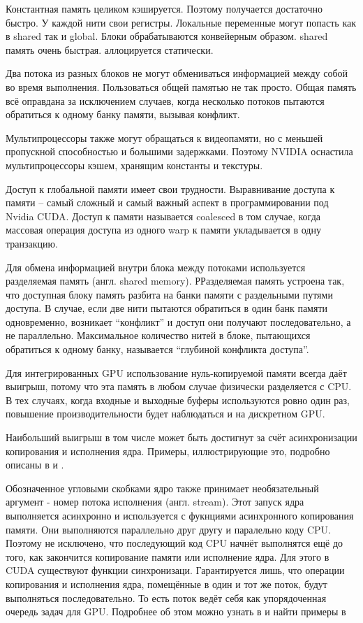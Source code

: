 \documentclass[a4paper,14pt,russian]{extreport}
\begin{document}
\par Константная память целиком кэшируется. Поэтому получается достаточно быстро. У каждой нити свои регистры. Локальные переменные могут попасть как в shared так и global. Блоки обрабатываются конвейерным образом. shared память очень быстрая. аллоцируется статически. 
\par Два потока из разных блоков не могут обмениваться информацией между собой во время выполнения. Пользоваться общей памятью не так просто. Общая память всё оправдана за исключением случаев, когда несколько потоков пытаются обратиться к одному банку памяти, вызывая конфликт. 
\par Мультипроцессоры также могут обращаться к видеопамяти, но с меньшей пропускной способностью и большими задержками. Поэтому NVIDIA оснастила мультипроцессоры кэшем, хранящим константы и текстуры. 
\par Доступ к глобальной памяти имеет свои трудности. Выравнивание доступа к памяти – самый сложный и самый важный аспект в программировании под Nvidia CUDA. Доступ к памяти называется coalesced в том случае, когда массовая операция доступа из одного warp к памяти укладывается в одну транзакцию.
\par Для обмена информацией внутри блока между потоками используется разделяемая память (англ. shared memory). РРазделяемая память устроена так, что доступная блоку память разбита на банки памяти с раздельными путями доступа. В случае, если две нити пытаются обратиться в один банк памяти одновременно, возникает “конфликт” и доступ они получают последовательно, а не параллельно. Максимальное количество нитей в блоке, пытающихся обратиться к одному банку, называется “глубиной конфликта доступа”.
\par Для интегрированных GPU использование нуль-копируемой памяти всегда даёт выигрыш, потому что эта память в любом случае физически разделяется с CPU. В тех случаях, когда входные и выходные буферы используются ровно один раз, повышение производительности будет наблюдаться и на дискретном GPU.
\par Наибольший выигрыш в том числе может быть достигнут за счёт асинхронизации копирования и исполнения ядра. Примеры, иллюстрирующие это, подробно описаны в \cite{sanders} и \cite{cuda_best}. 
\par Обозначенное угловыми скобками ядро также принимает необязательный аргумент - номер потока исполнения (англ. stream). Этот запуск ядра выполняется асинхронно и используется с фукнциями асинхронного копирования памяти. Они выполняются параллельно друг другу и паралельно коду CPU. Поэтому не исключено, что последующий код CPU начнёт выполнятся ещё до того, как закончится копирование памяти или исполнение ядра. Для этого в CUDA существуют функции синхронизаци. Гарантируется лишь, что операции копирования и исполнения ядра, помещённые в один и тот же поток, будут выполняться последовательно. То есть поток ведёт себя как упорядоченная очередь задач для GPU. Подробнее об этом можно узнать в \cite{cuda_guide} и найти примеры в \cite{sanders}
\end{document}
